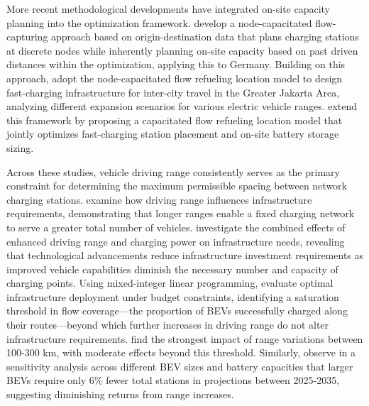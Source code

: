         More recent methodological developments have integrated on-site capacity planning into the optimization framework. \citet{ROSE2020102189} develop a node-capacitated flow-capturing approach based on origin-destination data that plans charging stations at discrete nodes while inherently planning on-site capacity based on past driven distances within the optimization, applying this to Germany. Building on this approach, \citet{NUGROHO2025101470} adopt the node-capacitated flow refueling location model to design fast-charging infrastructure for inter-city travel in the Greater Jakarta Area, analyzing different expansion scenarios for various electric vehicle ranges. \citet{Rehman2026} extend this framework by proposing a capacitated flow refueling location model that jointly optimizes fast-charging station placement and on-site battery storage sizing.
        
        Across these studies, vehicle driving range consistently serves as the primary constraint for determining the maximum permissible spacing between network charging stations. \citet{Csiszar2020} examine how driving range influences infrastructure requirements, demonstrating that longer ranges enable a fixed charging network to serve a greater total number of vehicles. \citet{Kavianipour2021} investigate the combined effects of enhanced driving range and charging power on infrastructure needs, revealing that technological advancements reduce infrastructure investment requirements as improved vehicle capabilities diminish the necessary number and capacity of charging points. Using mixed-integer linear programming, \citet{Wang2018} evaluate optimal infrastructure deployment under budget constraints, identifying a saturation threshold in flow coverage—the proportion of \acp{BEV} successfully charged along their routes—beyond which further increases in driving range do not alter infrastructure requirements. \citet{Rehman2026} find the strongest impact of range variations between 100-300 km, with moderate effects beyond this threshold. Similarly, \citet{NUGROHO2025101470} observe in a sensitivity analysis across different \ac{BEV} sizes and battery capacities that larger \acp{BEV} require only 6\% fewer total stations in projections between 2025-2035, suggesting diminishing returns from range increases.


